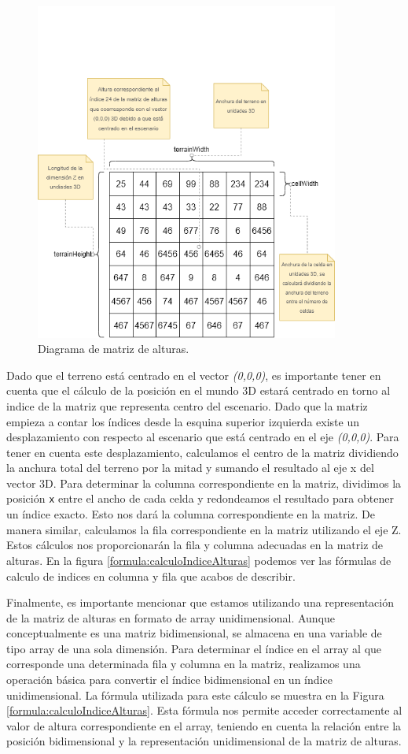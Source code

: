 \documentclass[a4paper, 11pt]{book}
\begin{document}
\begin{figure}[h]
  \centering
  \includegraphics[width=10cm, keepaspectratio]{img/terrain.drawio.png}
  \caption{Diagrama de matriz de alturas.}
  \label{fig:terrainDrawio}
\end{figure}
Dado que el terreno está centrado en el vector \emph{(0,0,0)}, es importante tener en cuenta que el cálculo de la posición en el mundo \textsc{3D} estará centrado en torno al indice de la matriz que representa centro del escenario. 
Dado que la matriz empieza a contar los índices desde la esquina superior izquierda existe un desplazamiento con respecto al escenario que está centrado en el eje \emph{(0,0,0)}.
Para tener en cuenta este desplazamiento, calculamos el centro de la matriz dividiendo la anchura total del terreno por la mitad y sumando el resultado al eje x del vector 3D. 
Para determinar la columna correspondiente en la matriz, dividimos la posición \texttt{x} entre el ancho de cada celda y redondeamos el resultado para obtener un índice exacto. Esto nos dará la columna correspondiente en la matriz. 
De manera similar, calculamos la fila correspondiente en la matriz utilizando el eje Z. Estos cálculos nos proporcionarán la fila y columna adecuadas en la matriz de alturas.
En la figura \ref{formula:calculoIndiceAlturas} podemos ver las fórmulas de calculo de indices en columna y fila que acabos de describir.

Finalmente, es importante mencionar que estamos utilizando una representación de la matriz de alturas en formato de array unidimensional. Aunque conceptualmente es una matriz bidimensional, se almacena en una variable de tipo array de una sola dimensión. 
Para determinar el índice en el array al que corresponde una determinada fila y columna en la matriz, realizamos una operación básica para convertir el índice bidimensional en un índice unidimensional.
La fórmula utilizada para este cálculo se muestra en la Figura \ref{formula:calculoIndiceAlturas}. Esta fórmula nos permite acceder correctamente al valor de altura correspondiente en el array, teniendo en cuenta la relación entre la posición bidimensional y la representación unidimensional de la matriz de alturas.
\end{document}
